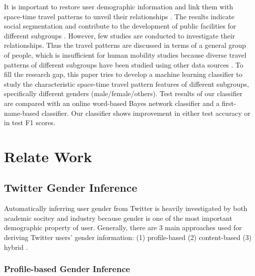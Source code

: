 \documentclass{article}
\begin{document}
It is important to restore user demographic information and link them with space-time travel patterns to unveil their relationships \cite{ahn2016gender}. The results indicate social segmentation and contribute to the development of public facilities for different subgroups \cite{ang2010analyzing}. However, few studies are conducted to investigate their relationships. Thus the travel patterns are discussed in terms of a general group of people, which is insufficient for human mobility studies because diverse travel patterns of different subgroups have been studied using other data sources \cite{kang2010analyzing}. To fill the research gap, this paper tries to develop a machine learning classifier to study the characteristic space-time travel pattern features of different subgroups, specifically different genders (male/female/others). Test results of our classifier are compared with an online word-based Bayes network classifier and a first-name-based classifier. Our classifier shows improvement in either test accuracy or in test F1 scores.  

\section{Relate Work}

\subsection{Twitter Gender Inference}
Automatically inferring user gender from Twitter is heavily investigated by both academic socitey and industry because gender is one of the most important demographic property of user.  Generally, there are 3 main approaches used for deriving Twitter users' gender information: (1) profile-based (2) content-based (3) hybrid \cite{beretta2015interactive}.

\subsubsection{Profile-based Gender Inference}
\end{document}
